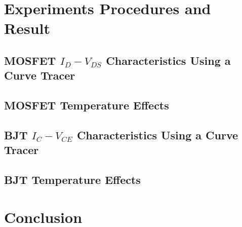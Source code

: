 \documentclass[journal]{IEEEtran}
\begin{document}
\section{Experiments Procedures and Result}
\subsection{MOSFET $I_{D}-V_{DS}$ Characteristics Using a Curve Tracer}
\subsection{MOSFET Temperature Effects}
\subsection{BJT $I_{C}-V_{CE}$ Characteristics Using a Curve Tracer}
\subsection{BJT Temperature Effects}
\section{Conclusion}
\end{document}
